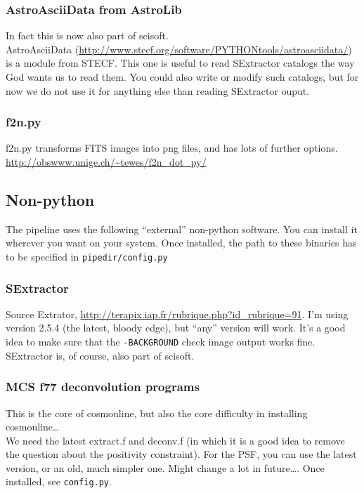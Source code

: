 \subsubsection{AstroAsciiData from AstroLib}

In fact this is now also part of scisoft.\\
AstroAsciiData (\url{http://www.stecf.org/software/PYTHONtools/astroasciidata/}) is a module from STECF. This one is useful to read SExtractor catalogs the way God wants us to read them. You could also write or modify such catalogs, but for now we do not use it for anything else than reading SExtractor ouput.

\subsubsection{f2n.py}

f2n.py transforms FITS images into png files, and has lots of further options.\\
\url{http://obswww.unige.ch/~tewes/f2n_dot_py/}


\subsection{Non-python}

The pipeline uses the following ``external'' non-python software. You can install it wherever you want on your system. Once installed, the path to these binaries has to be specified in \verb+pipedir/config.py+

\subsubsection{SExtractor}
Source Extrator, \url{http://terapix.iap.fr/rubrique.php?id_rubrique=91}. I'm using version 2.5.4 (the latest, bloody edge), but ``any'' version will work. It's a good idea to make sure that the \verb+-BACKGROUND+ check image output works fine. SExtractor is, of course, also part of scisoft.

\subsubsection{MCS f77 deconvolution programs}
This is the core of cosmouline, but also the core difficulty in installing cosmouline\ldots\\
We need the latest extract.f and deconv.f (in which it is a good idea to remove the question about the positivity constraint). For the PSF, you can use the latest version, or an old, much simpler one. Might change a lot in future\ldots. Once installed, see \verb+config.py+.


